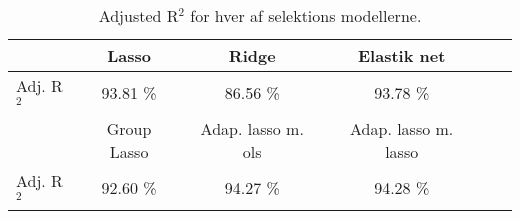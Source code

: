 \begin{table}
\center
\begin{tabular}{lccccc}
\toprule
& Lasso & Ridge & Elastik net \\ \midrule
Adj. R$^2$ & 93.81 \%  & 86.56 \% & 93.78 \%  \\ \bottomrule \toprule 
& Group Lasso & Adap. lasso m. ols & Adap. lasso m. lasso  \\ \midrule
Adj. R$^2$ & 92.60 \% & 94.27 \%  & 94.28 \% \\ \bottomrule 
 \end{tabular}
\caption{Adjusted R$^2$ for hver af selektions modellerne.} \label{tab:adj_r2_shrinkage_tab}
\end{table}